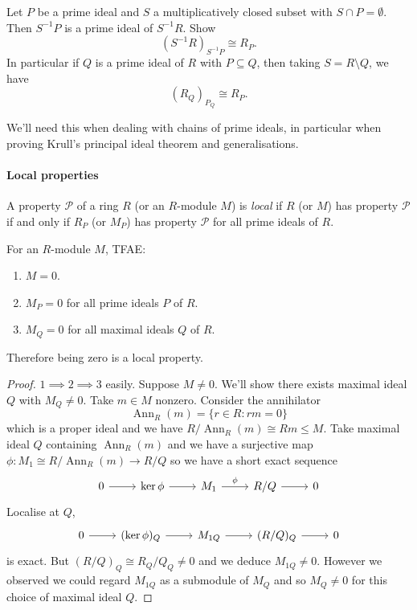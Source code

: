 \documentclass[a4paper]{article}
\DeclareMathOperator{\Ann}{Ann} %
\begin{document}
\begin{ex}
  Let \(P\) be a prime ideal and \(S\) a multiplicatively closed subset with \(S \cap P = \emptyset\). Then \(S^{-1}P\) is a prime ideal of \(S^{-1}R\). Show
  \[
    (S^{-1}R)_{S^{-1}P} \cong R_P.
  \]
  In particular if \(Q\) is a prime ideal of \(R\) with \(P \subseteq Q\), then taking \(S = R \setminus Q\), we have
  \[
    (R_Q)_{P_Q} \cong R_P.
  \]

  We'll need this when dealing with chains of prime ideals, in particular when proving Krull's principal ideal theorem and generalisations.
\end{ex}

\paragraph{Local properties}

\begin{definition}
  A property \(\mathcal P\) of a ring \(R\) (or an \(R\)-module \(M\)) is \emph{local} if \(R\) (or \(M\)) has property \(\mathcal P\) if and only if \(R_P\) (or \(M_P\)) has property \(\mathcal P\) for all prime ideals of \(R\).
\end{definition}

\begin{lemma}
  For an \(R\)-module \(M\), TFAE:
  \begin{enumerate}
  \item \(M = 0\).
  \item \(M_P = 0\) for all prime ideals \(P\) of \(R\).
  \item \(M_Q = 0\) for all maximal ideals \(Q\) of \(R\).
  \end{enumerate}
  Therefore being zero is a local property.
\end{lemma}

\begin{proof}
  \(1 \implies 2 \implies 3\) easily. Suppose \(M \neq 0\). We'll show there exists maximal ideal \(Q\) with \(M_Q \neq 0\). Take \(m \in M\) nonzero. Consider the annihilator
  \[
    \Ann_R(m) = \{r \in R: rm = 0\}
  \]
  which is a proper ideal and we have \(R/\Ann_R(m) \cong Rm \leq M\). Take maximal ideal \(Q\) containing \(\Ann_R(m)\) and we have a surjective map \(\phi: M_1 \cong R/\Ann_R(m) \to R/Q\) so we have a short exact sequence
  \[
    \begin{tikzcd}
      0 \ar[r] & \ker \phi \ar[r] & M_1 \ar[r, "\phi"] & R/Q \ar[r] & 0
    \end{tikzcd}
  \]
  Localise at \(Q\),
  \[
    \begin{tikzcd}
      0 \ar[r] & (\ker \phi)_Q \ar[r] & M_{1Q} \ar[r] & (R/Q)_Q \ar[r] & 0
    \end{tikzcd}
  \]
  is exact. But \((R/Q)_Q \cong R_Q/Q_Q \neq 0\) and we deduce \(M_{1Q} \neq 0\). However we observed we could regard \(M_{1Q}\) as a submodule of \(M_Q\) and so \(M_Q \neq 0\) for this choice of maximal ideal \(Q\).
\end{proof}
\end{document}
